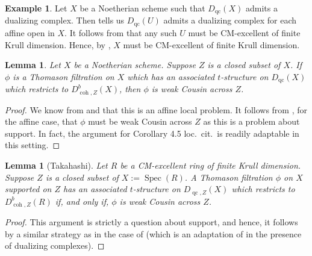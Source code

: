 \documentclass[11pt]{amsart}
\theoremstyle{plain}
\newtheorem{lemma}[theorem]{Lemma}
\theoremstyle{definition}
\newtheorem{example}[theorem]{Example}
\numberwithin{equation}{section}
\numberwithin{theorem}{section}
\begin{document}
\begin{example}\label{ex:dualizing_complex_implies_cm_excellent_finite_krull_dim}
    Let $X$ be a Noetherian scheme such that $D_{\operatorname{qc}}(X)$ admits a dualizing complex. Then \cite[\href{https://stacks.math.columbia.edu/tag/0A86}{Tag 0A86}]{StacksProject} tells us $D_{\operatorname{qc}}(U)$ admits a dualizing complex for each affine open in $X$. It follows from \cite[Corollary 1.4]{Kawasaki:2002} that any such $U$ must be CM-excellent of finite Krull dimension. Hence, by , $X$ must be CM-excellent of finite Krull dimension.
\end{example}

\begin{lemma}\label{lem:wc_pointer}
    Let $X$ be a Noetherian scheme. Suppose $Z$ is a closed subset of $X$. If $\phi$ is a Thomason filtration on $X$ which has an associated $t$-structure on $D_{\operatorname{qc}}(X)$ which restricts to $D^b_{\operatorname{coh},Z} (X)$, then $\phi$ is weak Cousin across $Z$.
\end{lemma}

\begin{proof}
    We know from  and  that this is an affine local problem. It follows from \cite[Theorem 4.4]{AlonsoTarrio/JeremiasLopez/Saorin:2010}, for the affine case, that $\phi$ must be weak Cousin across $Z$ as this is a problem about support. In fact, the argument for Corollary 4.5 loc.\ cit.\ is readily adaptable in this setting.
\end{proof}

\begin{lemma}[Takahashi]\label{lem:relative_Takahashi}
    Let $R$ be a CM-excellent ring of finite Krull dimension. Suppose $Z$ is a closed subset of $X:=\operatorname{Spec}(R)$. A Thomason filtration $\phi$ on $X$ supported on $Z$ has an associated $t$-structure on $D_{\operatorname{qc},Z}(X)$ which restricts to $D^b_{\operatorname{coh},Z} (R)$ if, and only if, $\phi$ is weak Cousin across $Z$.
\end{lemma}

\begin{proof}
    This argument is strictly a question about support, and hence, it follows by a similar strategy as in the case of \cite[Theorem 5.5]{Takahashi:2023} (which is an adaptation of \cite[Theorem 6.9]{AlonsoTarrio/JeremiasLopez/Saorin:2010} in the presence of dualizing complexes).
\end{proof}
\end{document}

